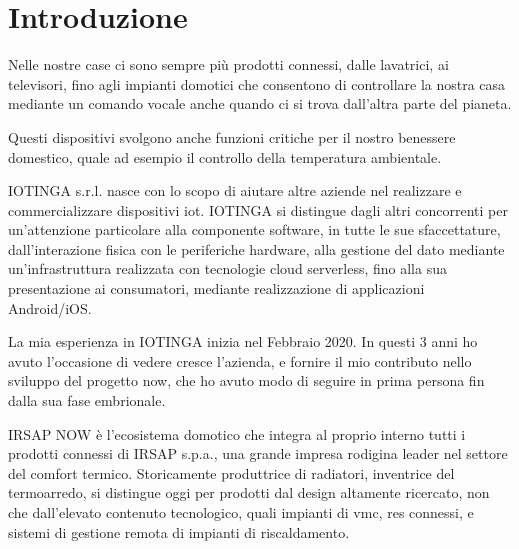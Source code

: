 \documentclass[12pt,a4paper,twoside,titlepage]{book}
\begin{document}
\frontmatter

\begin{frontespizio}
\end{frontespizio}

\tableofcontents

\mainmatter


\chapter{Introduzione}

Nelle nostre case ci sono sempre più prodotti connessi,
dalle lavatrici, ai televisori, fino agli impianti domotici che
consentono di controllare la nostra casa mediante un comando vocale
anche quando ci si trova dall'altra parte del pianeta.

Questi dispositivi svolgono anche funzioni critiche per il nostro
benessere domestico, quale ad esempio il controllo della temperatura
ambientale.

IOTINGA s.r.l. nasce con lo scopo di aiutare altre aziende nel realizzare e
commercializzare dispositivi \Gls{iot}. IOTINGA si distingue dagli altri
concorrenti per un'attenzione particolare alla componente software,
in tutte le sue sfaccettature, dall'interazione fisica con le periferiche
hardware, alla gestione del dato mediante un'infrastruttura realizzata
con tecnologie \gls{cloud} \gls{serverless}, fino alla sua presentazione ai consumatori,
mediante realizzazione di applicazioni Android/iOS.

La mia esperienza in IOTINGA inizia nel Febbraio 2020. In questi 3 anni
ho avuto l'occasione di vedere cresce l'azienda, e fornire il mio contributo
nello sviluppo del progetto \Gls{now}, che ho avuto modo di seguire
in prima persona fin dalla sua fase embrionale.

IRSAP NOW è l'ecosistema domotico che integra al proprio interno tutti
i prodotti connessi di IRSAP s.p.a., una grande impresa rodigina leader
nel settore del comfort termico. Storicamente produttrice di radiatori,
inventrice del termoarredo, si distingue oggi per prodotti dal design altamente
ricercato, non che dall'elevato contenuto tecnologico, quali impianti di \Gls{vmc},
\glspl{re} connessi, e sistemi di gestione remota di impianti di riscaldamento.
\end{document}
